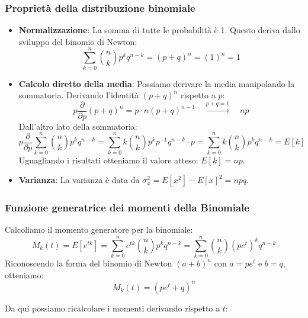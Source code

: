 \documentclass{article}
\theoremstyle{remark}
\begin{document}
\subsubsection{Proprietà della distribuzione binomiale}
\begin{itemize}
    \item \textbf{Normalizzazione}: La somma di tutte le probabilità è 1. Questo deriva dallo sviluppo del binomio di Newton:
    \[ \sum_{k=0}^{n} \binom {n}{k}p^kq^{n-k} = (p+q)^n = (1)^n = 1 \]
    
    \item \textbf{Calcolo diretto della media}: Possiamo derivare la media manipolando la sommatoria. Derivando l'identità $(p+q)^n$ rispetto a $p$:
    \[
    p \frac{\partial}{\partial p} (p + q)^n = p \cdot n(p+q)^{n-1} \quad \xrightarrow{p+q=1} \quad np
    \]
    Dall'altro lato della sommatoria:
    \[
    p \frac{\partial}{\partial p} \sum_{k=0}^{n} \binom{n}{k} p^k q^{n-k} = \sum_{k=0}^{n} k \binom{n}{k} p^k p^{-1} q^{n-k} \cdot p = \sum_{k=0}^{n} k \binom{n}{k} p^k q^{n-k} = E[k]
    \]
    Uguagliando i risultati otteniamo il valore atteso: $E[k] = np$.
    
    \item \textbf{Varianza}: La varianza è data da $\sigma_x^2 = E[x^2] - E[x]^2 = npq$.
\end{itemize}

\subsubsection{Funzione generatrice dei momenti della Binomiale}
Calcoliamo il momento generatore per la binomiale:
\[
M_k(t) = E[e^{tk}] = \sum_{k=0}^{n} e^{tk} \binom{n}{k} p^k q^{n-k} = \sum_{k=0}^{n} \binom{n}{k} (pe^t)^k q^{n-k}
\]
Riconoscendo la forma del binomio di Newton $(a+b)^n$ con $a=pe^t$ e $b=q$, otteniamo:
\[
M_k(t) = (pe^t + q)^n
\]

Da qui possiamo ricalcolare i momenti derivando rispetto a $t$:
\end{document}
